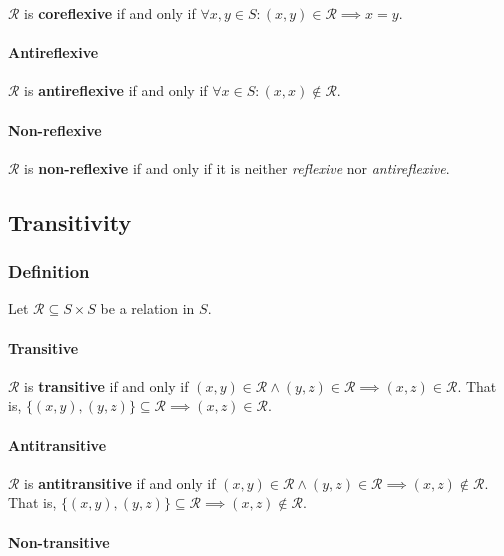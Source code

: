 $\mathcal{R}$ is \textbf{coreflexive} if and only if
$ \forall x, y \in S : (x, y) \in \mathcal{R} \implies x = y$.

\paragraph{Antireflexive}

$\mathcal{R}$ is \textbf{antireflexive} if and only if
$ \forall x \in S: (x, x) \notin \mathcal{R}$.

\paragraph{Non-reflexive}

$\mathcal{R}$ is \textbf{non-reflexive} if and only if it is neither
\textit{reflexive} nor \textit{antireflexive}.


\subsection{Transitivity}
\label{sec:transitivity}

\subsubsection{Definition}

Let $\mathcal{R} \subseteq S \times S$ be a relation in $S$.

\paragraph{Transitive}

$\mathcal{R}$ is \textbf{transitive} if and only if
$(x, y) \in \mathcal{R} \land (y, z) \in \mathcal{R} \implies (x, z)
\in \mathcal{R}$. That is,
$\{(x, y), (y, z)\} \subseteq \mathcal{R} \implies (x, z) \in
\mathcal{R}$.

\paragraph{Antitransitive}

$\mathcal{R}$ is \textbf{antitransitive} if and only if
$ (x, y) \in \mathcal{R} \land (y, z) \in \mathcal{R} \implies (x, z)
\notin \mathcal{R}$. That is,
$ \{ (x, y), (y, z) \} \subseteq \mathcal{R} \implies (x, z) \notin
\mathcal{R} $.

\paragraph{Non-transitive}

